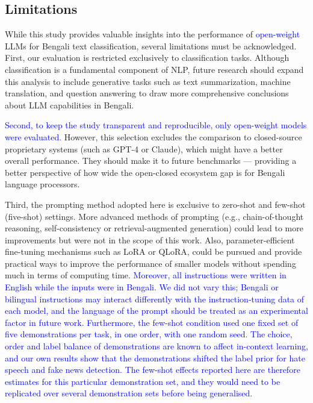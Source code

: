\documentclass[10pt,letterpaper]{article}
\newcommand{\rev}[1]{\textcolor{blue}{#1}}
\begin{document}
\subsection*{Limitations}

While this study provides valuable insights into the performance of \rev{open-weight} LLMs for Bengali text classification, several limitations must be acknowledged. First, our evaluation is restricted exclusively to classification tasks. Although classification is a fundamental component of NLP, future research should expand this analysis to include generative tasks such as text summarization, machine translation, and question answering to draw more comprehensive conclusions about LLM capabilities in Bengali.

\rev{Second, to keep the study transparent and reproducible, only open-weight models were evaluated.} However, this selection excludes the comparison to closed-source proprietary systems (such as GPT-4 or Claude), which might have a better overall performance. They should make it to future benchmarks — providing a better perspective of how wide the open-closed ecosystem gap is for Bengali language processors.

Third, the prompting method adopted here is exclusive to zero-shot and few-shot (five-shot) settings. More advanced methods of prompting (e.g., chain-of-thought reasoning, self-consistency or retrieval-augmented generation) could lead to more improvements but were not in the scope of this work. Also, parameter-efficient fine-tuning mechanisms such as LoRA or QLoRA, could be pursued and provide practical ways to improve the performance of smaller models without spending much in terms of computing time. \rev{Moreover, all instructions were written in English while the inputs were in Bengali. We did not vary this; Bengali or bilingual instructions may interact differently with the instruction-tuning data of each model, and the language of the prompt should be treated as an experimental factor in future work. Furthermore, the few-shot condition used one fixed set of five demonstrations per task, in one order, with one random seed. The choice, order and label balance of demonstrations are known to affect in-context learning, and our own results show that the demonstrations shifted the label prior for hate speech and fake news detection. The few-shot effects reported here are therefore estimates for this particular demonstration set, and they would need to be replicated over several demonstration sets before being generalised.}
\end{document}
